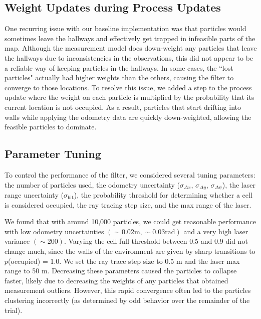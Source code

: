\subsection{Weight Updates during Process Updates}

One recurring issue with our baseline implementation was that particles would sometimes leave the hallways and effectively get trapped in infeasible parts of the map. Although the measurement model does down-weight any particles that leave the hallways due to inconsistencies in the observations, this did not appear to be a reliable way of keeping particles in the hallways. In some cases, the ``lost particles" actually had higher weights than the others, causing the filter to converge to those locations.
To resolve this issue, we added a step to the process update where the weight on each particle is multiplied by the probability that its current location is not occupied. As a result, particles that start drifting into walls while applying the odometry data are quickly down-weighted, allowing the feasible particles to dominate.


\subsection{Parameter Tuning}

To control the performance of the filter, we considered several tuning parameters: the number of particles used, the odometry uncertainty ($\sigma_{\Delta x}$, $\sigma_{\Delta y}$, $\sigma_{\Delta \psi}$), the laser range uncertainty ($\sigma_\text{hit}$), the probability threshold for determining whether a cell is considered occupied, the ray tracing step size, and the max range of the laser.

We found that with around 10,000 particles, we could get reasonable performance with low odometry uncertainties $(\sim0.02 \text{m}, \sim0.03 \text{rad})$ and a very high laser variance $(\sim200)$. Varying the cell full threshold between 0.5 and 0.9 did not change much, since the walls of the environment are given by sharp transitions to $p$(occupied) = 1.0. We set the ray trace step size to 0.5 m and the laser max range to 50 m. Decreasing these parameters caused the particles to collapse faster, likely due to decreasing the weights of any particles that obtained measurement outliers. However, this rapid convergence often led to the particles clustering incorrectly (as determined by odd behavior over the remainder of the trial).
